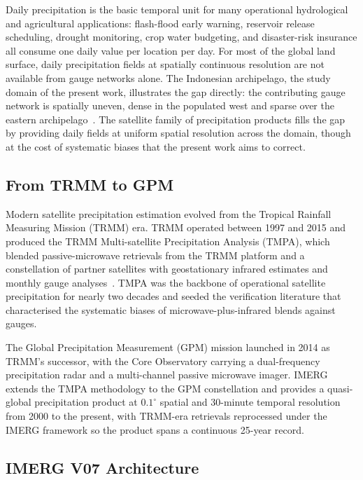 Daily precipitation is the basic temporal unit for many
operational hydrological and agricultural applications:
flash-flood early warning, reservoir release scheduling,
drought monitoring, crop water budgeting, and disaster-risk
insurance all consume one daily value per location per day.
For most of the global land surface, daily precipitation
fields at spatially continuous resolution are not available
from gauge networks alone. The Indonesian archipelago, the
study domain of the present work, illustrates the gap directly:
the contributing gauge network is spatially uneven, dense in the
populated west and sparse over the eastern archipelago~\citep{ref:chen2008}. The
satellite family of precipitation products fills the gap by
providing daily fields at uniform spatial resolution across the
domain, though at the cost of systematic biases that the
present work aims to correct.

\subsection{From TRMM to GPM}

Modern satellite precipitation estimation evolved from the
Tropical Rainfall Measuring Mission (TRMM) era. TRMM operated
between 1997 and 2015 and produced the TRMM Multi-satellite
Precipitation Analysis (TMPA), which blended passive-microwave
retrievals from the TRMM platform and a constellation of
partner satellites with geostationary infrared estimates and
monthly gauge analyses~\citep{ref:huffman2007}. TMPA was the
backbone of operational satellite precipitation for nearly two
decades and seeded the verification literature that
characterised the systematic biases of microwave-plus-infrared
blends against gauges.

The Global Precipitation Measurement (GPM) mission launched in
2014 as TRMM's successor, with the Core Observatory carrying a
dual-frequency precipitation radar and a multi-channel passive
microwave imager. IMERG~\citep{ref:hou2014, ref:huffman2020} extends the
TMPA methodology to the GPM constellation and provides a
quasi-global precipitation product at $0.1^{\circ}$ spatial and
30-minute temporal resolution from 2000 to the present, with
TRMM-era retrievals reprocessed under the IMERG framework so
the product spans a continuous 25-year record.

\subsection{IMERG V07 Architecture}

